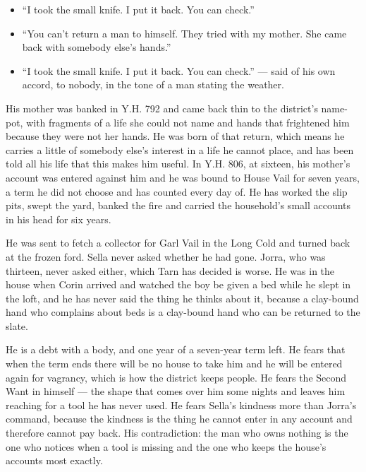\documentclass{design/chronicle}
\begin{document}
{\begin{itemize}[leftmargin=1.4em,itemsep=1pt,topsep=3pt,parsep=0pt]
\item “I took the small knife. I put it back. You can check.”

\item “You can’t return a man to himself. They tried with my mother. She came back with somebody else’s hands.”

\item “I took the small knife. I put it back. You can check.” --- said of his own accord, to nobody, in the tone of a man stating the weather.

\end{itemize}

His mother was banked in Y.H. 792 and came back thin to the district’s name-pot, with fragments of a life she could not name and hands that frightened him because they were not her hands. He was born of that return, which means he carries a little of somebody else’s interest in a life he cannot place, and has been told all his life that this makes him useful. In Y.H. 806, at sixteen, his mother’s account was entered against him and he was bound to House Vail for seven years, a term he did not choose and has counted every day of. He has worked the slip pits, swept the yard, banked the fire and carried the household’s small accounts in his head for six years.

He was sent to fetch a collector for Garl Vail in the Long Cold and turned back at the frozen ford. Sella never asked whether he had gone. Jorra, who was thirteen, never asked either, which Tarn has decided is worse. He was in the house when Corin arrived and watched the boy be given a bed while he slept in the loft, and he has never said the thing he thinks about it, because a clay-bound hand who complains about beds is a clay-bound hand who can be returned to the slate.

He is a debt with a body, and one year of a seven-year term left. He fears that when the term ends there will be no house to take him and he will be entered again for vagrancy, which is how the district keeps people. He fears the Second Want in himself — the shape that comes over him some nights and leaves him reaching for a tool he has never used. He fears Sella’s kindness more than Jorra’s command, because the kindness is the thing he cannot enter in any account and therefore cannot pay back. His contradiction: the man who owns nothing is the one who notices when a tool is missing and the one who keeps the house’s accounts most exactly.

}
\end{document}

